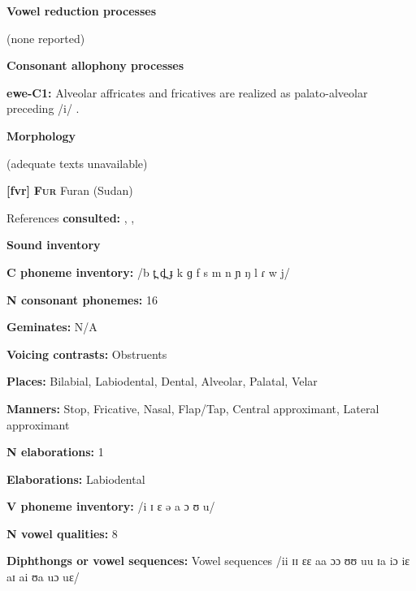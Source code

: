 \textbf{Vowel reduction processes}



(none reported)



\textbf{Consonant allophony processes}



\textbf{ewe-C1:} Alveolar affricates and fricatives are realized as palato-alveolar preceding /i/ \citep[9]{Jalloh2005}.



\textbf{Morphology}



(adequate texts unavailable)



\textbf{[fvr]}   \textbf{\textsc{Fur}}  Furan (Sudan)



References \textbf{consulted:} \citet{Jakobi1990},  \citet{KutschLojengaWaag2004}, \citet{Noel2008}



\textbf{Sound inventory}



\textbf{C phoneme inventory:} /b t̪ d̪ ɟ k ɡ f s m n ɲ ŋ l ɾ w j/



\textbf{N consonant phonemes:} 16



\textbf{Geminates:} N/A



\textbf{Voicing contrasts:} Obstruents



\textbf{Places:} Bilabial, Labiodental, Dental, Alveolar, Palatal, Velar



\textbf{Manners:} Stop, Fricative, Nasal, Flap/Tap, Central approximant, Lateral approximant



\textbf{N elaborations:} 1



\textbf{Elaborations:} Labiodental



\textbf{V phoneme inventory:} /i ɪ ɛ ə a ɔ ʊ u/



\textbf{N vowel qualities:} 8



\textbf{Diphthongs or vowel sequences:} Vowel sequences /ii ɪɪ ɛɛ aa ɔɔ ʊʊ uu ɪa iɔ iɛ aɪ ai ʊa uɔ uɛ/



